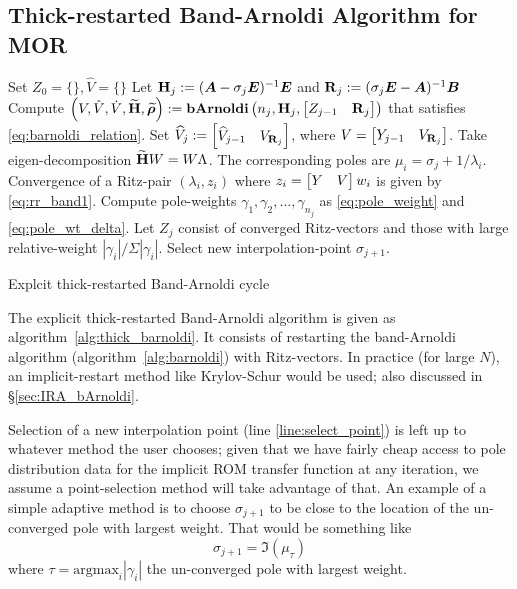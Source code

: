 \subsection{Thick-restarted Band-Arnoldi Algorithm for MOR}
\begin{algorithm}[htb]%
\DontPrintSemicolon
{}

\BlankLine

Set $Z_0 =\{\}, \widehat{V}=\{\}$\;
 {
	Let $\textbf{\textup{H}}_j := (\bm{A}-\sigma_j \bm{E})^{-1}\bm{E}$ and $\textbf{\textup{R}}_j := (\sigma_j \bm{E} -\bm{A})^{-1}\bm{B}$ \; 
      Compute $\left( V ,  \hat{V}, \dot{V}, \widetilde{\textbf{\textup{H}}}, \widetilde{\boldsymbol{\rho}} \right) := \operatorname*{\textbf{bArnoldi}}\left(n_j,\textbf{\textup{H}}_j,\begin{bmatrix} Z_{j-1} &\textbf{\textup{R}}_j\end{bmatrix}\right)$	that satisfies \eqref{eq:barnoldi_relation}.\;
	Set $\widehat{V}_j := \begin{bmatrix} \widehat{V}_{j-1} & V_{\textbf{\textup{R}}_j}\end{bmatrix}$, where $V = \begin{bmatrix} Y_{j-1} & V_{\textbf{\textup{R}}_j}\end{bmatrix}$. 
      \BlankLine
      \BlankLine	
Take eigen-decomposition $\widetilde{\textbf{\textup{H}}} W = W \Lambda$. The corresponding poles are $\mu_i = \sigma_j+1/\lambda_i$. Convergence of a Ritz-pair $(\lambda_i,z_i)$ where $z_i = \begin{bmatrix} Y &V\end{bmatrix} w_i$ is given by \eqref{eq:rr_band1}. \; 
\BlankLine
       Compute pole-weights $\gamma_1,\gamma_2,\ldots,\gamma_{n_j}$ as \eqref{eq:pole_weight} and \eqref{eq:pole_wt_delta}.\;
\BlankLine
	Let $Z_j$ consist of converged Ritz-vectors and those with large relative-weight $|\gamma_i|/\Sigma |\gamma_i|$.\; 
\BlankLine
	 Select new interpolation-point $\sigma_{j+1}$.  \label{line:select_point}\;
}
\BlankLine

\BlankLine
{} 
\caption{{\sc Explcit thick-restarted Band-Arnoldi cycle}}
\label{alg:thick_barnoldi}
\end{algorithm}
The explicit thick-restarted Band-Arnoldi algorithm is given as algorithm~\ref{alg:thick_barnoldi}. It consists of restarting the band-Arnoldi algorithm  (algorithm~\ref{alg:barnoldi}) with Ritz-vectors.  In practice (for large $N$), an implicit-restart method like Krylov-Schur\cite{stewart2002krylov} would be used; also discussed in \S\ref{sec:IRA_bArnoldi}.    

Selection of a new interpolation point (line \ref{line:select_point}) is left up to whatever method the user chooses; given that we have fairly cheap access to pole distribution data for the implicit ROM transfer function at any iteration, we assume a point-selection method will take advantage of that.  An example of a  simple adaptive method is to choose $\sigma_{j+1}$ to be close to the location of the un-converged pole with largest weight.  That would be something like   
\[
\sigma_{j+1}=\Im(\mu_\tau)
\]
 where $\tau=\text{argmax}_i|\gamma_i|$ the un-converged pole with largest weight.
\clearpage

